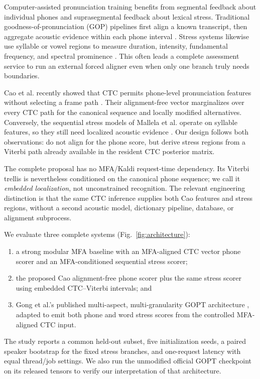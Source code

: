 \documentclass[10pt,conference]{IEEEtran}
\begin{document}
Computer-assisted pronunciation training benefits from segmental feedback
about individual phones and suprasegmental feedback about lexical stress.
Traditional goodness-of-pronunciation (GOP) pipelines first align a known
transcript, then aggregate acoustic evidence within each phone interval
\cite{witt2000phone,hu2015improved}. Stress systems likewise use syllable or
vowel regions to measure duration, intensity, fundamental frequency, and
spectral prominence \cite{fry1958experiments,yarra2019comparison}. This often
leads a complete assessment service to run an external forced aligner even when
only one branch truly needs boundaries.

Cao et al. recently showed that CTC permits phone-level pronunciation features
without selecting a frame path \cite{cao2024framework}. Their
alignment-free vector marginalizes over every CTC path for the canonical
sequence and locally modified alternatives. Conversely, the sequential stress
models of Mallela et al. operate on syllable features, so they still need
localized acoustic evidence \cite{mallela2024comparative}. Our design follows
both observations: do not align for the phone score, but derive stress regions
from a Viterbi path already available in the resident CTC posterior matrix.

The complete proposal has no MFA/Kaldi request-time dependency. Its Viterbi
trellis is nevertheless conditioned on the canonical phone sequence; we call
it \emph{embedded localization}, not unconstrained recognition. The relevant
engineering distinction is that the same CTC inference supplies both Cao
features and stress regions, without a second acoustic model, dictionary
pipeline, database, or alignment subprocess.

We evaluate three complete systems (Fig.~\ref{fig:architecture}):
\begin{enumerate}
    \item a strong modular MFA baseline with an MFA-aligned CTC vector phone
    scorer and an MFA-conditioned sequential stress scorer;
    \item the proposed Cao alignment-free phone scorer plus the same stress
    scorer using embedded CTC--Viterbi intervals; and
    \item Gong et al.'s published multi-aspect, multi-granularity GOPT
    architecture \cite{gong2022gopt}, adapted to emit both phone and word
    stress scores from the controlled MFA-aligned CTC input.
\end{enumerate}
The study reports a common held-out subset, five initialization seeds, a paired
speaker bootstrap for the fixed stress branches, and one-request latency with
equal thread/job settings. We also run the unmodified official GOPT checkpoint
on its released tensors to verify our interpretation of that architecture.
\end{document}
